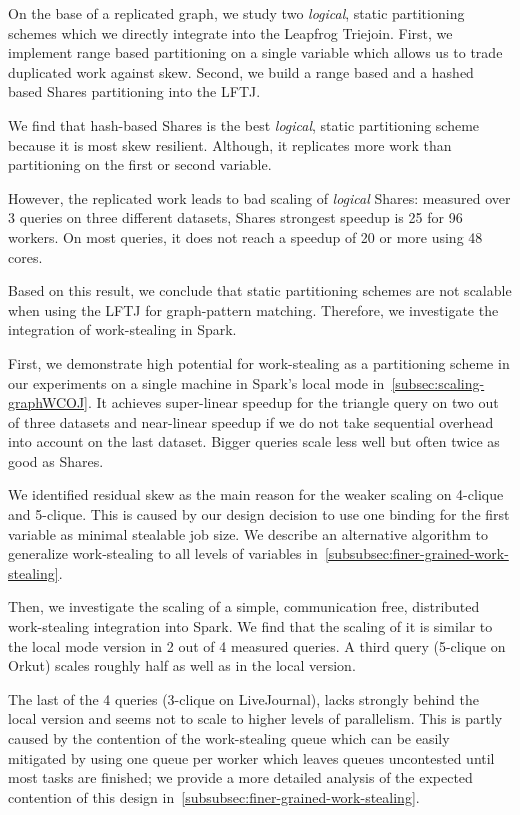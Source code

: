 On the base of a replicated graph, we study two \textit{logical}, static partitioning schemes which we directly integrate into the
Leapfrog Triejoin.
First, we implement range based partitioning on a single variable which allows us to trade duplicated work against skew.
Second, we build a range based and a hashed based Shares partitioning into the \textsc{LFTJ}.

We find that hash-based Shares is the best \textit{logical}, static partitioning scheme because it is most skew resilient.
Although, it replicates more work than partitioning on the first or second variable.

However, the replicated work leads to bad scaling of \textit{logical} Shares:
measured over 3 queries on three different datasets, Shares strongest speedup is 25 for 96 workers.
On most queries, it does not reach a speedup of 20 or more using 48 cores.

Based on this result, we conclude that static partitioning schemes are not scalable when using the \textsc{LFTJ} for graph-pattern
matching.
Therefore, we investigate the integration of work-stealing in Spark.

First, we demonstrate high potential for work-stealing as a partitioning scheme in our experiments on a single machine in Spark's local
mode in~\cref{subsec:scaling-graphWCOJ}.
It achieves super-linear speedup for the triangle query on two out of three datasets and near-linear speedup if we do not take sequential
overhead into account on the last dataset.
Bigger queries scale less well but often twice as good as Shares.

We identified residual skew as the main reason for the weaker scaling on 4-clique and 5-clique.
This is caused by our design decision to use one binding for the first variable as minimal stealable job size.
We describe an alternative algorithm to generalize work-stealing to all levels of variables in~\cref{subsubsec:finer-grained-work-stealing}.

Then, we investigate the scaling of a simple, communication free, distributed work-stealing integration into Spark.
We find that the scaling of it is similar to the local mode version in 2 out of 4 measured queries.
A third query (5-clique on Orkut) scales roughly half as well as in the local version.

The last of the 4 queries (3-clique on LiveJournal), lacks strongly behind the local version and seems not to scale
to higher levels of parallelism.
This is partly caused by the contention of the work-stealing queue which can be easily mitigated
by using one queue per worker which leaves queues uncontested until most tasks are finished;
we provide a more detailed analysis of the expected contention of this design in~\cref{subsubsec:finer-grained-work-stealing}.

